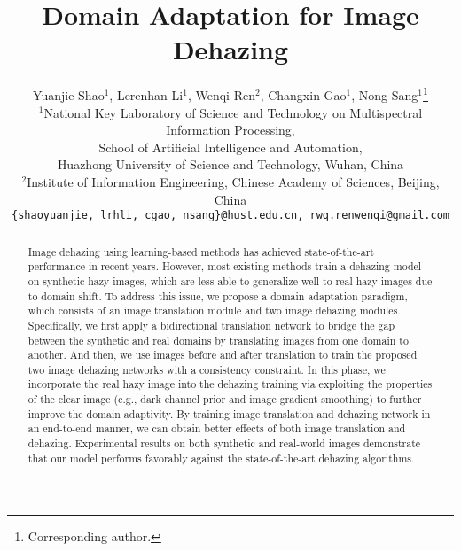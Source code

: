 \documentclass[10pt,twocolumn,letterpaper]{article}
\begin{document}
\title{Domain Adaptation for Image Dehazing}


\author{
	Yuanjie Shao$^1$, 
	Lerenhan Li$^1$, 
	Wenqi Ren$^2$, 
	Changxin Gao$^1$, 
	Nong Sang$^1$\thanks{Corresponding author.}\\
	$^1$National Key Laboratory of Science and Technology on Multispectral Information Processing,\\
	School of Artificial Intelligence and Automation, \\
	Huazhong University of Science and Technology, Wuhan, China\\
	$^2$Institute of Information Engineering, Chinese Academy of Sciences, Beijing, China\\
	{\tt\small \{shaoyuanjie, lrhli, cgao, nsang\}@hust.edu.cn, rwq.renwenqi@gmail.com}
}

\maketitle
\thispagestyle{empty}
\begin{abstract}
Image dehazing using learning-based methods has achieved state-of-the-art performance in recent years.
However, most existing methods train a dehazing model on synthetic hazy images, which are less able to generalize well to real hazy images due to domain shift.
To address this issue, we propose a domain adaptation paradigm,
which consists of an image translation module and two image dehazing modules. 
Specifically, we first apply a bidirectional translation network to bridge the gap between the synthetic and real domains by translating images from one domain to another.
And then, we use images before and after translation to train the proposed two image dehazing networks with a consistency constraint.
In this phase, we incorporate the real hazy image into the dehazing training via exploiting the properties of the clear image (e.g., dark channel prior and image gradient smoothing) to further improve the domain adaptivity.
By training image translation and dehazing network in an end-to-end manner, we can obtain better effects of both image translation and dehazing.
Experimental results on both synthetic and real-world images demonstrate that our model performs favorably against the state-of-the-art dehazing algorithms.
\end{abstract}
\end{document}
